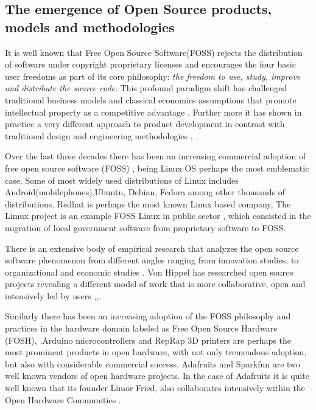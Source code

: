 \documentclass{ICED-Paper}%
\begin{document}
\subsection{The emergence of Open Source products, models and methodologies}

It is well known that Free Open Source Software(FOSS) rejects the distribution of software under copyright proprietary licenses and encourages the four basic user freedoms as part of its core philosophy\cite{Freedoms}: \emph{the freedom to use, study, improve and distribute the source code}. This profound paradigm shift has challenged traditional business models and classical economics assumptions that promote intellectual property as a competitive advantage \cite{Para_shift}. Further more it has shown in practice a very different approach to product development in contrast with traditional design and engineering methodologies \cite{HowItWorks}, \cite{bazaar}.
\bigskip

Over the last three decades there has been an increasing commercial adoption of free open source software (FOSS) \cite{Adoption}, being Linux OS perhaps the most emblematic case. Some of most widely used distributions of Linux includes Android(mobilephones),Ubuntu, Debian, Fedora among other thousands of distributions\cite{}. Redhat is perhaps the most known Linux based company,  The Limux project is an example FOSS Linux in public sector \cite{Limux}, which consisted in the migration of local government software from proprietary software to FOSS.
\bigskip

There is an extensive body of empirical research that analyzes the open source software phenomenon from different angles ranging from innovation studies\cite{HowItWorks}, to organizational \cite{ActivityTheoryOpenSource} and economic studies \cite{Economics}. Von Hippel has researched open source projects revealing a different model of work that is more collaborative, open and intensively led by users \cite{HowItWorks},\cite{hippel_4},\cite{hippel_2}.
\bigskip

Similarly there has been an increasing adoption of the FOSS philosophy and practices in the hardware domain labeled as Free Open Source Hardware (FOSH)\cite{FH}, \cite{what_OH}.Arduino microcontrollers and RepRap 3D printers are perhaps the most prominent products in open hardware, with not only tremendous adoption, but also with considerable commercial success. Adafruits and Sparkfun are two well known vendors of open hardware projects. In the case of Adafruits it is quite well known that its founder Limor Fried, also collaborates intensively within the Open Hardware Communities \cite{Million_Dollar}.
\bigskip
\end{document}
